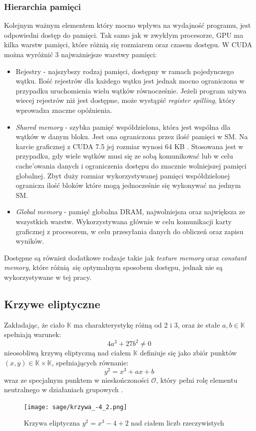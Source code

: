 \subsubsection{Hierarchia pamięci}
Kolejnym ważnym elementem który mocno wpływa na wydajność
programu, jest odpowiedni dostęp do pamięci.
Tak samo jak w zwykłym procesorze, GPU ma kilka warstw
pamięci, które różnią się rozmiarem oraz czasem dostępu.
W CUDA można wyróżnić 3 najważniejsze warstwy pamięci:
\begin{itemize}
    \item Rejestry - najszybszy rodzaj pamięci, dostępny w ramach pojedynczego wątku.
          Ilość rejestrów dla każdego wątku jest jednak mocno ograniczona w przypadku
          uruchomienia wielu wątków równocześnie. Jeżeli program używa wiecej rejestrów niż jest dostępne,
          może wystąpić \textit{register spilling}, który wprowadza znaczne opóźnienia.
    \item \textit{Shared memory} - szybka pamięć współdzielona, która jest wspólna dla wątków w danym bloku. Jest ona ograniczona
          przez ilość pamięci w SM. Na karcie graficznej z CUDA 7.5 jej rozmiar wynosi 64 KB \cite{CudaDeveloper}.
          Stosowana jest w przypadku, gdy wiele wątków musi się ze sobą komunikować lub w celu cache'owania danych
          i ograniczenia dostępu do znacznie wolniejszej pamięci globalnej.
          Zbyt duży rozmiar wykorzystywanej pamięci współdzielonej ogranicza ilość bloków które mogą jednocześnie się
          wykonywać na jednym SM.
    \item \textit{Global memory} - pamięć globalna DRAM, najwolniejsza oraz największa ze wszystkich warstw. Wykorzystywana głównie w celu
          komunikacji karty graficznej z procesorem, w celu przesyłania danych do obliczeń oraz zapisu wyników.
\end{itemize}
Dostępne są również dodatkowe rodzaje takie jak \textit{texture memory} oraz \textit{constant memory},
które różnią się optymalnym sposobem dostępu, jednak nie są wykorzystywane w tej pracy.

\subsection{Krzywe eliptyczne}
Zakładając, że ciało $\mathbb{K}$ ma charakterystykę różną od 2 i 3,
oraz że stałe $a, b \in \mathbb{K}$ spełniają warunek:
\[4a^3 + 27b^2 \neq 0\]
nieosobliwą krzywą eliptyczną nad ciałem $\mathbb{K}$ definiuje się jako zbiór punktów $(x,y) \in \mathbb{K} \times \mathbb{K}$,
spełniających równanie:
\[y^2 = x^3 + ax + b\]
wraz ze specjalnym punktem w nieskończoności $\mathcal{O}$, który pełni rolę elementu neutralnego
w działaniach grupowych
\cite{Stinson2021}.
\begin{figure}[H]
    \centering \texttt{[image: sage/krzywa\_-4\_2.png]}
    \caption{Krzywa eliptyczna $y^2=x^3-4+2$ nad ciałem liczb rzeczywistych}
    \label{fig:krzywa_rel}
\end{figure}

